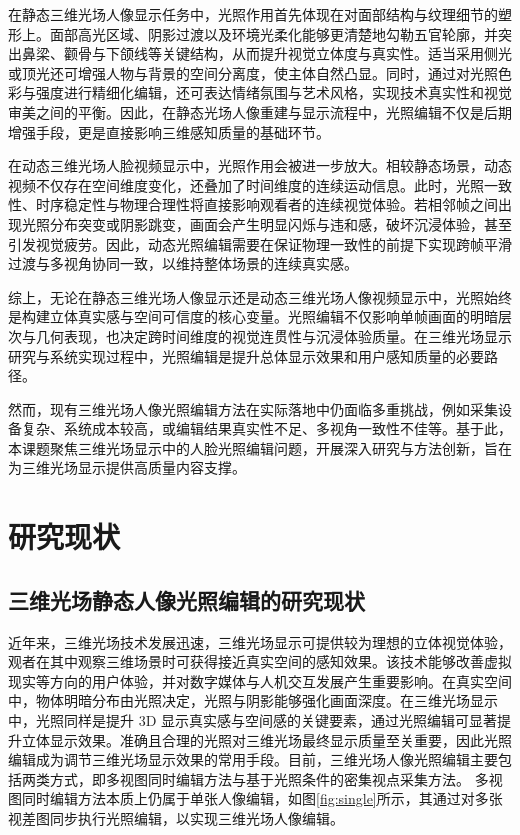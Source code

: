 在静态三维光场人像显示任务中，光照作用首先体现在对面部结构与纹理细节的塑形上。面部高光区域、阴影过渡以及环境光柔化能够更清楚地勾勒五官轮廓，并突出鼻梁、颧骨与下颌线等关键结构，从而提升视觉立体度与真实性。适当采用侧光或顶光还可增强人物与背景的空间分离度，使主体自然凸显。同时，通过对光照色彩与强度进行精细化编辑，还可表达情绪氛围与艺术风格，实现技术真实性和视觉审美之间的平衡。因此，在静态光场人像重建与显示流程中，光照编辑不仅是后期增强手段，更是直接影响三维感知质量的基础环节。

在动态三维光场人脸视频显示中，光照作用会被进一步放大。相较静态场景，动态视频不仅存在空间维度变化，还叠加了时间维度的连续运动信息。此时，光照一致性、时序稳定性与物理合理性将直接影响观看者的连续视觉体验。若相邻帧之间出现光照分布突变或阴影跳变，画面会产生明显闪烁与违和感，破坏沉浸体验，甚至引发视觉疲劳。因此，动态光照编辑需要在保证物理一致性的前提下实现跨帧平滑过渡与多视角协同一致，以维持整体场景的连续真实感。

综上，无论在静态三维光场人像显示还是动态三维光场人像视频显示中，光照始终是构建立体真实感与空间可信度的核心变量。光照编辑不仅影响单帧画面的明暗层次与几何表现，也决定跨时间维度的视觉连贯性与沉浸体验质量。在三维光场显示研究与系统实现过程中，光照编辑是提升总体显示效果和用户感知质量的必要路径。

然而，现有三维光场人像光照编辑方法在实际落地中仍面临多重挑战，例如采集设备复杂、系统成本较高，或编辑结果真实性不足、多视角一致性不佳等。基于此，本课题聚焦三维光场显示中的人脸光照编辑问题，开展深入研究与方法创新，旨在为三维光场显示提供高质量内容支撑。


\section{研究现状}
\subsection{三维光场静态人像光照编辑的研究现状}
近年来，三维光场技术发展迅速，三维光场显示可提供较为理想的立体视觉体验，观者在其中观察三维场景时可获得接近真实空间的感知效果。该技术能够改善虚拟现实等方向的用户体验，并对数字媒体与人机交互发展产生重要影响\cite{Bruno2010,Ho2020,Yang2013}。在真实空间中，物体明暗分布由光照决定，光照与阴影能够强化画面深度\cite{陈嘉琪2018,Todd2025}。在三维光场显示中，光照同样是提升 3D 显示真实感与空间感的关键要素，通过光照编辑可显著提升立体显示效果。准确且合理的光照对三维光场最终显示质量至关重要，因此光照编辑成为调节三维光场显示效果的常用手段。目前，三维光场人像光照编辑主要包括两类方式，即多视图同时编辑方法与基于光照条件的密集视点采集方法\cite{Yang2023}。
多视图同时编辑方法本质上仍属于单张人像编辑，如图\ref{fig:single}所示，其通过对多张视差图同步执行光照编辑，以实现三维光场人像编辑。

